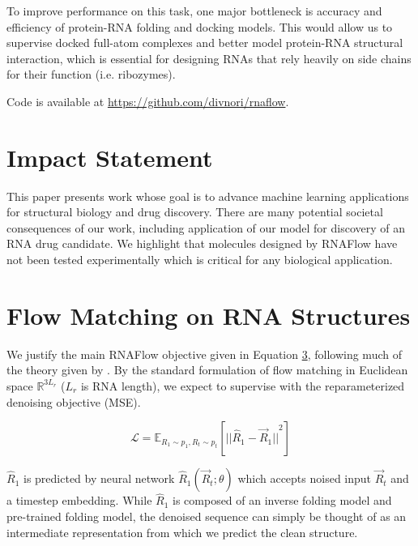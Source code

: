 \documentclass{article}
\theoremstyle{plain}
\theoremstyle{definition}
\theoremstyle{remark}
\begin{document}
To improve performance on this task, one major bottleneck is accuracy and efficiency of protein-RNA folding and docking models. This would allow us to supervise docked full-atom complexes and better model protein-RNA structural interaction, which is essential for designing RNAs that rely heavily on side chains for their function (i.e. ribozymes).

Code is available at \url{https://github.com/divnori/rnaflow}.

\section*{Impact Statement}

This paper presents work whose goal is to advance machine learning applications for structural biology and drug discovery. There are many potential societal consequences of our work, including application of our model for discovery of an RNA drug candidate. We highlight that molecules designed by RNAFlow have not been tested experimentally which is critical for any biological application. 




\newpage
\appendix
\onecolumn


\section{Flow Matching on RNA Structures}

We justify the main RNAFlow objective given in Equation \hyperref[loss]{3}, following much of the theory given by \citet{jing2023alphafold}. By the standard formulation of flow matching in Euclidean space $\mathbb{R}^{3L_r}$ ($L_r$ is RNA length), we expect to supervise with the reparameterized denoising objective (MSE).

$$ \mathcal{L} = \mathbb{E}_{R_1 \sim p_1, R_t \sim p_t} [{||\hat R_1 - \vec R_1||}^2] $$

$\hat R_1$ is predicted by neural network $\hat R_1 (\vec R_t; \theta)$ which accepts noised input $\vec R_t$ and a timestep embedding. While $\hat R_1$ is composed of an inverse folding model and pre-trained folding model, the denoised sequence can simply be thought of as an intermediate representation from which we predict the clean structure.
\end{document}

